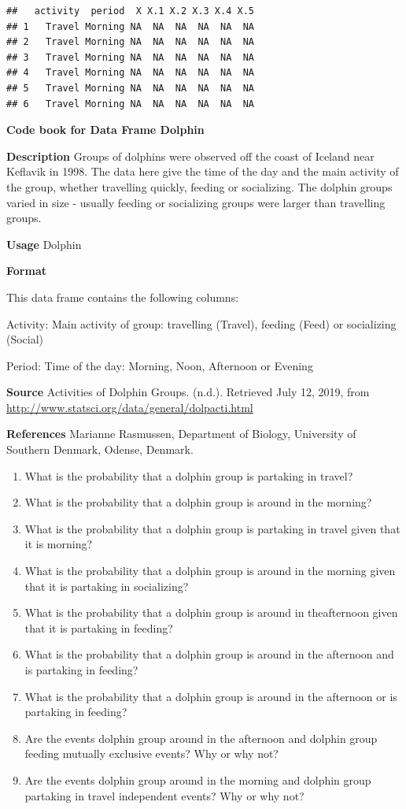 \documentclass[
]{book}
\providecommand{\tightlist}{%
  \setlength{\itemsep}{0pt}\setlength{\parskip}{0pt}}
\begin{document}
\begin{verbatim}
##   activity  period  X X.1 X.2 X.3 X.4 X.5
## 1   Travel Morning NA  NA  NA  NA  NA  NA
## 2   Travel Morning NA  NA  NA  NA  NA  NA
## 3   Travel Morning NA  NA  NA  NA  NA  NA
## 4   Travel Morning NA  NA  NA  NA  NA  NA
## 5   Travel Morning NA  NA  NA  NA  NA  NA
## 6   Travel Morning NA  NA  NA  NA  NA  NA
\end{verbatim}

\textbf{Code book for Data Frame Dolphin}

\textbf{Description}
Groups of dolphins were observed off the coast of Iceland near Keflavik in 1998. The data here give the time of the day and the main activity of the group, whether travelling quickly, feeding or socializing. The dolphin groups varied in size - usually feeding or socializing groups were larger than travelling groups.

\textbf{Usage}
Dolphin

\textbf{Format}

This data frame contains the following columns:

Activity: Main activity of group: travelling (Travel), feeding (Feed) or socializing (Social)

Period: Time of the day: Morning, Noon, Afternoon or Evening

\textbf{Source}
Activities of Dolphin Groups. (n.d.). Retrieved July 12, 2019, from \url{http://www.statsci.org/data/general/dolpacti.html}

\textbf{References}
Marianne Rasmussen, Department of Biology, University of Southern Denmark, Odense, Denmark.

\begin{enumerate}
\def\labelenumi{\alph{enumi}.}
\tightlist
\item
  What is the probability that a dolphin group is partaking in travel?
\item
  What is the probability that a dolphin group is around in the morning?
\item
  What is the probability that a dolphin group is partaking in travel given that it is morning?
\item
  What is the probability that a dolphin group is around in the morning given that it is partaking in socializing?
\item
  What is the probability that a dolphin group is around in theafternoon given that it is partaking in feeding?
\item
  What is the probability that a dolphin group is around in the afternoon and is partaking in feeding?
\item
  What is the probability that a dolphin group is around in the afternoon or is partaking in feeding?
\item
  Are the events dolphin group around in the afternoon and dolphin group feeding mutually exclusive events? Why or why not?
\item
  Are the events dolphin group around in the morning and dolphin group partaking in travel independent events? Why or why not?
\end{enumerate}
\end{document}
